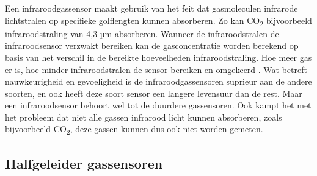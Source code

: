 Een infraroodgassensor maakt gebruik van het feit dat gasmoleculen infrarode lichtstralen op specifieke golflengten kunnen absorberen. Zo kan CO\textsubscript{2} bijvoorbeeld infraroodstraling van 4,3 µm absorberen. Wanneer de infraroodstralen de infraroodsensor verzwakt bereiken kan de gasconcentratie worden berekend op basis van het verschil in de bereikte hoeveelheden infraroodstraling. Hoe meer gas er is, hoe minder infraroodstralen de sensor bereiken en omgekeerd
. Wat betreft nauwkeurigheid en gevoeligheid is de infraroodgassensoren suprieur aan de andere soorten, en ook heeft deze soort sensor een langere levensuur dan de rest. Maar een infraroodsensor behoort wel tot de duurdere gassensoren. Ook kampt het met het probleem dat niet alle gassen infrarood licht kunnen absorberen, zoals bijvoorbeeld CO\textsubscript{2}, deze gassen kunnen dus ook niet worden gemeten.


\subsection{Halfgeleider gassensoren}
\label{subsec:MOS}

